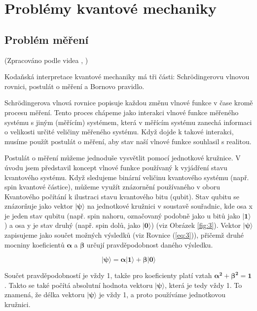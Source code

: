 \section{Problémy kvantové mechaniky}
    \subsection{Problém měření}
    (Zpracováno podle videa , \cite{measprob})

Kodaňská interpretace kvantové mechaniky má tři části: Schrödingerovu vlnovou rovnici, postulát o měření a Bornovo pravidlo.

Schrödingerova vlnová rovnice popisuje každou změnu vlnové funkce v čase kromě procesu měření. Tento proces chápeme jako interakci vlnové funkce měřeného systé\-mu s jiným (měřícím) systémem, která v měřícím systému zanechá informaci o velikosti určité veličiny měřeného systému. Když dojde k takové interakci, musíme použít postulát o měření, aby stav naší vlnové funkce souhlasil s realitou.

Postulát o měření můžeme jednoduše vysvětlit pomocí jednotkové kružnice. V úvodu jsem představil koncept vlnové funkce používaný k vyjádření stavu kvantového systému. Když sledujeme binární veličinu kvantového systému (např. spin kvantové částice), můžeme využít znázorně\-ní používaného v oboru Kvantového počítání k ilustraci stavu kvantového bitu (qubit). Stav qubitu se znázorňuje jako vektor $\bm{|\psi\rangle}$ na jednotkové kružnici v soustavě souřadnic, kde osa x je jeden stav qubitu (např. spin nahoru, označovaný podobně jako u bitů jako $\bm{|1\rangle}$) a osa y je stav druhý (např. spin dolů, jako $\bm{|0\rangle}$) (viz Obrázek \ref{fig:3}). Vektor $\bm{|\psi\rangle}$ zapisujeme jako součet možných výsledků (viz Rovnice (\ref{eq:3})), přičemž druhé mocniny koeficientů $\bm{\alpha}$ a $\bm{\beta}$ určují pravděpodobnost daného výsledku. 

\begin{equation}
    \bm{|\psi\rangle = \alpha|1\rangle + \beta|0\rangle}
    \label{eq:3}
\end{equation}

Součet pravděpodobností je vždy 1, takže pro koeficienty platí vztah $\bm{\alpha^2 + \beta^2 = 1}$. Takto se také počítá absolutní hodnota vektoru $\bm{|\psi\rangle}$, která je tedy vždy 1. To znamená, že délka vektoru $\bm{|\psi\rangle}$ je vždy 1, a proto používáme jednotkovou kružnici. 

\clearpage

